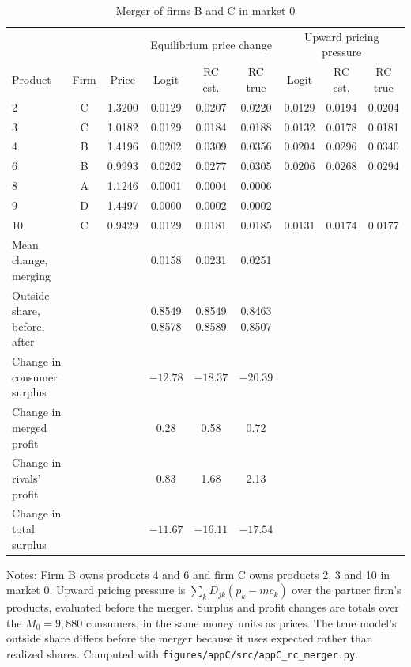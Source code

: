 \begin{table}[htbp]
\centering
\caption{Merger of firms B and C in market 0}
\label{tab:C-merger-m0}
\footnotesize
\setlength{\tabcolsep}{4pt}
\begin{tabular}{@{}lcccccccc@{}}
\toprule
 & & & \multicolumn{3}{c}{Equilibrium price change} & \multicolumn{3}{c}{Upward pricing pressure} \\
\cmidrule(lr){4-6}\cmidrule(lr){7-9}
Product & Firm & Price & Logit & RC est. & RC true & Logit & RC est. & RC true \\
\midrule
2 & C & 1.3200 & 0.0129 & 0.0207 & 0.0220 & 0.0129 & 0.0194 & 0.0204 \\
3 & C & 1.0182 & 0.0129 & 0.0184 & 0.0188 & 0.0132 & 0.0178 & 0.0181 \\
4 & B & 1.4196 & 0.0202 & 0.0309 & 0.0356 & 0.0204 & 0.0296 & 0.0340 \\
6 & B & 0.9993 & 0.0202 & 0.0277 & 0.0305 & 0.0206 & 0.0268 & 0.0294 \\
8 & A & 1.1246 & 0.0001 & 0.0004 & 0.0006 & & & \\
9 & D & 1.4497 & 0.0000 & 0.0002 & 0.0002 & & & \\
10 & C & 0.9429 & 0.0129 & 0.0181 & 0.0185 & 0.0131 & 0.0174 & 0.0177 \\
\midrule
Mean change, merging & & & 0.0158 & 0.0231 & 0.0251 & & & \\
Outside share, before, after & & & \makecell{0.8549\\0.8578} & \makecell{0.8549\\0.8589} &
\makecell{0.8463\\0.8507} & & & \\
Change in consumer surplus & & & $-12.78$ & $-18.37$ & $-20.39$ & & & \\
Change in merged profit & & & 0.28 & 0.58 & 0.72 & & & \\
Change in rivals' profit & & & 0.83 & 1.68 & 2.13 & & & \\
Change in total surplus & & & $-11.67$ & $-16.11$ & $-17.54$ & & & \\
\bottomrule
\end{tabular}

\vspace{3pt}
\begin{minipage}{0.97\textwidth}
\footnotesize Notes: Firm B owns products 4 and 6 and firm C owns products 2, 3 and 10 in market 0. Upward pricing
pressure is $\sum_kD_{jk}(p_k - mc_k)$ over the partner firm's products, evaluated before the merger. Surplus and profit
changes are totals over the $M_0 = 9{,}880$ consumers, in the same money units as prices. The true model's outside
share differs before the merger because it uses expected rather than realized shares. Computed with
\texttt{figures/appC/src/appC\_rc\_merger.py}.
\end{minipage}
\end{table}

